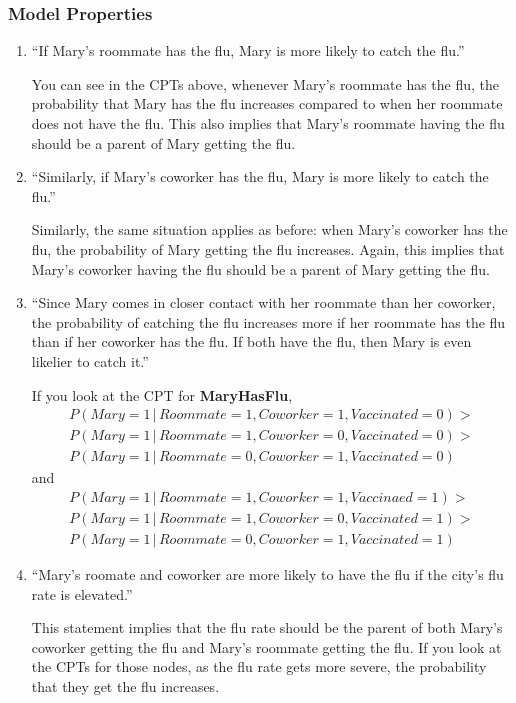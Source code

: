 \documentclass[12pt]{article}
\begin{document}
\subsubsection{Model Properties}
\begin{enumerate}
	\item ``If Mary's roommate has the flu, Mary is more likely to catch the flu.''
	
	You can see in the CPTs above, whenever Mary's roommate has the flu, the probability
	that Mary has the flu increases compared to when her roommate does not have the flu.
	This also implies that Mary's roommate having the flu should be a parent of Mary getting
	the flu.
	
	\item ``Similarly, if Mary's coworker has the flu, Mary is more likely to catch the flu.''
	
	Similarly, the same situation applies as before: when Mary's coworker has the flu, the
	probability of Mary getting the flu increases. Again, this implies that Mary's coworker
	having the flu should be a parent of Mary getting the flu.
	
	\item ``Since Mary comes in closer contact with her roommate than her coworker, the
	probability of catching the flu increases more if her roommate has the flu than if
	her coworker has the flu. If both have the flu, then Mary is even likelier to catch it.''
	
	If you look at the CPT for {\bf MaryHasFlu},
	\begin{multline*}
		P(Mary = 1 \,|\, Roommate = 1, Coworker = 1, Vaccinated = 0) > \\
		P(Mary = 1 \,|\, Roommate= 1, Coworker = 0, Vaccinated = 0) > \\
		P(Mary = 1 \,|\, Roommate = 0, Coworker = 1, Vaccinated = 0)
	\end{multline*}
	and
	\begin{multline*}
		P(Mary = 1 \,|\, Roommate = 1, Coworker = 1, Vaccinaed = 1) > \\
		P(Mary = 1 \,|\, Roommate= 1, Coworker = 0, Vaccinated = 1) > \\
		P(Mary = 1 \,|\, Roommate = 0, Coworker = 1, Vaccinated = 1)
	\end{multline*}
	
	\item ``Mary's roomate and coworker are more likely to have the flu if the city's
	flu rate is elevated.''
	
	This statement implies that the flu rate should be the parent of both Mary's coworker
	getting the flu and Mary's roommate getting the flu. If you look at the CPTs for those
	nodes, as the flu rate gets more severe, the probability that they get the flu increases.
	

\end{enumerate}
\end{document}
